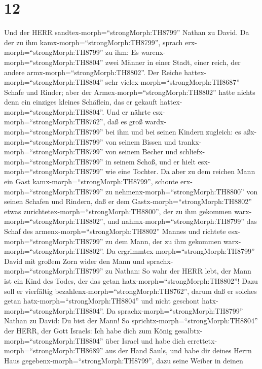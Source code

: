 \hypertarget{section-11}{%
\section{12}\label{section-11}}

 Und der HERR sandtex-morph=``strongMorph:TH8799'' Nathan zu
David. Da der zu ihm kamx-morph=``strongMorph:TH8799'', sprach
erx-morph=``strongMorph:TH8799'' zu ihm: Es
warenx-morph=``strongMorph:TH8804'' zwei Männer in einer Stadt, einer
reich, der andere armx-morph=``strongMorph:TH8802''.  Der
Reiche hattex-morph=``strongMorph:TH8804'' sehr
vielex-morph=``strongMorph:TH8687'' Schafe und Rinder;  aber
der Armex-morph=``strongMorph:TH8802'' hatte nichts denn ein einziges
kleines Schäflein, das er gekauft hattex-morph=``strongMorph:TH8804''.
Und er nährte esx-morph=``strongMorph:TH8762'', daß es groß
wardx-morph=``strongMorph:TH8799'' bei ihm und bei seinen Kindern
zugleich: es aßx-morph=``strongMorph:TH8799'' von seinem Bissen und
trankx-morph=``strongMorph:TH8799'' von seinem Becher und
schliefx-morph=``strongMorph:TH8799'' in seinem Schoß, und er hielt
esx-morph=``strongMorph:TH8799'' wie eine Tochter.  Da aber
zu dem reichen Mann ein Gast kamx-morph=``strongMorph:TH8799'', schonte
erx-morph=``strongMorph:TH8799'' zu nehmenx-morph=``strongMorph:TH8800''
von seinen Schafen und Rindern, daß er dem
Gastx-morph=``strongMorph:TH8802'' etwas
zurichtetex-morph=``strongMorph:TH8800'', der zu ihm gekommen
warx-morph=``strongMorph:TH8802'', und
nahmx-morph=``strongMorph:TH8799'' das Schaf des
armenx-morph=``strongMorph:TH8802'' Mannes und richtete
esx-morph=``strongMorph:TH8799'' zu dem Mann, der zu ihm gekommen
warx-morph=``strongMorph:TH8802''.  Da
ergrimmtex-morph=``strongMorph:TH8799'' David mit großem Zorn wider den
Mann und sprachx-morph=``strongMorph:TH8799'' zu Nathan: So wahr der
HERR lebt, der Mann ist ein Kind des Todes, der das getan
hatx-morph=``strongMorph:TH8802''!  Dazu soll er vierfältig
bezahlenx-morph=``strongMorph:TH8762'', darum daß er solches getan
hatx-morph=``strongMorph:TH8804'' und nicht geschont
hatx-morph=``strongMorph:TH8804''.  Da
sprachx-morph=``strongMorph:TH8799'' Nathan zu David: Du bist der Mann!
So sprichtx-morph=``strongMorph:TH8804'' der HERR, der Gott Israels: Ich
habe dich zum König gesalbtx-morph=``strongMorph:TH8804'' über Israel
und habe dich errettetx-morph=``strongMorph:TH8689'' aus der Hand Sauls,
 und habe dir deines Herrn Haus
gegebenx-morph=``strongMorph:TH8799'', dazu seine Weiber in deinen
